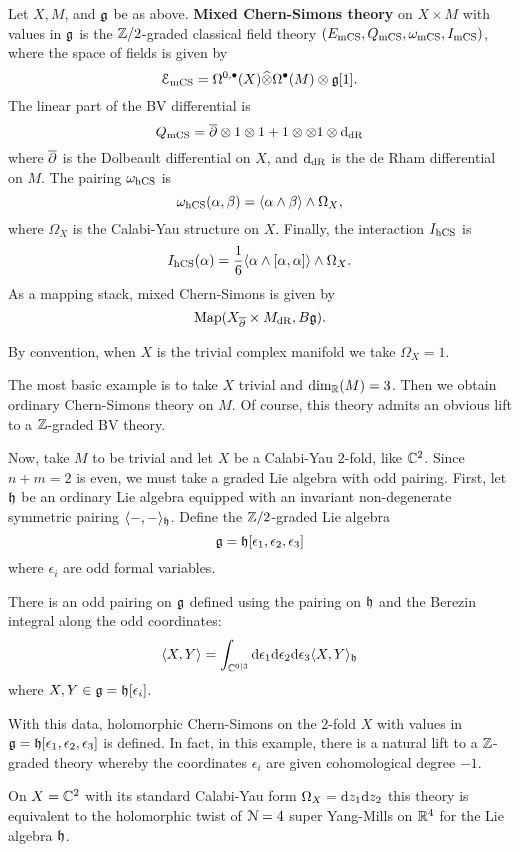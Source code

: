 \documentclass[10pt, oneside]{article}
\begin{document}
\begin{dfn}
Let $X, M$, and $\mathfrak g$ be as above.
{\bf Mixed Chern-Simons theory} on $X \times M$ with values in $\mathfrak g$ is the $\mathbb Z/2$-graded classical field theory $(E_{\mathrm{mCS}}, Q_{\mathrm{mCS}}, \omega_{\mathrm{mCS}}, I_{\mathrm{mCS}})$, where the space of fields is given by
\[
\mathcal E_{\mathrm{mCS}} = \Omega^{0,\bullet}(X) \widehat{\otimes} \Omega^\bullet(M) \otimes \mathfrak g [1] .
\]
The linear part of the BV differential is
\[
Q_{\mathrm{mCS}} = \overline{\partial} \otimes 1 \otimes 1 + 1 \otimes \otimes 1 \otimes {\rm d}_{\mathrm{dR}}
\]
where $\overline{\partial}$ is the Dolbeault differential on $X$, and ${\rm d}_{\mathrm{dR}}$ is the de Rham differential on $M$.
The pairing $\omega_{\mathrm{hCS}}$ is
\[
\omega_{\mathrm{hCS}} (\alpha,\beta) = \langle\alpha \wedge \beta\rangle \wedge \Omega_X ,
\]
where $\Omega_X$ is the Calabi-Yau structure on $X$.
Finally, the interaction $I_{\mathrm{hCS}}$ is
\[
I_{\mathrm{hCS}}(\alpha) = \frac 16 \langle\alpha \wedge [\alpha, \alpha]\rangle \wedge \Omega_X .
\]
As a mapping stack, mixed Chern-Simons is given by
\[
{\rm Map} (X_{\overline{\partial}} \times M_{\mathrm{dR}} , B \mathfrak g) .
\]

\end{dfn}

By convention, when $X$ is the trivial complex manifold we take $\Omega_X = 1$. 

\begin{eg}
The most basic  example is to take $X$ trivial and $\dim_{\mathbb R} (M) = 3$.
Then we obtain ordinary Chern-Simons theory on $M$. 
Of course, this theory admits an obvious lift to a $\mathbb Z$-graded BV theory. 
\end{eg}

\begin{eg} 
Now, take $M$ to be trivial and let $X$ be a Calabi-Yau $2$-fold, like $\mathbb C^2$.
Since $n + m = 2$ is even, we must take a graded Lie algebra with odd pairing. 
First, let $\mathfrak h$ be an ordinary Lie algebra equipped with an invariant non-degenerate symmetric pairing $\langle-,-\rangle_\mathfrak h$. 
Define the $\mathbb Z/2$-graded Lie algebra
\[
\mathfrak g = \mathfrak h[\epsilon_1,\epsilon_2, \epsilon_3] 
\]
where $\epsilon_i$ are odd formal variables. 

There is an odd pairing on $\mathfrak g$ defined using the pairing on $\mathfrak h$ and the Berezin integral along the odd coordinates:
\[
\langle X , Y\rangle = \int_{\mathbb C^{0|3}} {\rm d} \epsilon_1 {\rm d} \epsilon_2 {\rm d} \epsilon_3 \langle X, Y\rangle_\mathfrak h 
\] 
where $X,Y \in \mathfrak g = \mathfrak h[\epsilon_i]$.

With this data, holomorphic Chern-Simons on the $2$-fold $X$ with values in $\mathfrak g = \mathfrak h[\epsilon_1,\epsilon_2, \epsilon_3]$ is defined. In fact, in this example, there is a natural lift to a $\mathbb Z$-graded theory whereby the coordinates $\epsilon_i$ are given cohomological degree $-1$. 

On $X = \mathbb C^2$ with its standard Calabi-Yau form $\Omega_X = {\rm d} z_1 {\rm d} z_2$ this theory is equivalent to the holomorphic twist of $\mathcal N=4$ super Yang-Mills on $\mathbb R^4$ for the Lie algebra $\mathfrak h$. 

\end{eg} 
\end{document}
